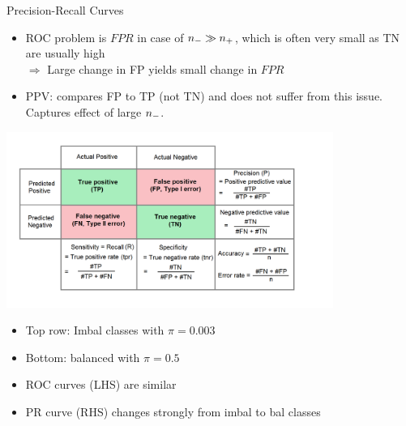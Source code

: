 \begin{vbframe}{Precision-Recall Curves}


\framebreak

\begin{itemize}
  \item ROC problem is $FPR$ in case of $n_{-} \gg n_{+}$, which is often
  very small as TN are usually high \\
  $\Rightarrow$ Large change in FP yields small change in $FPR$
  \item PPV: compares FP to TP (not TN) and does not suffer from this
  issue. Captures effect of large $n_{-}$.
\end{itemize}

\begin{center}
  \includegraphics[width=0.8\textwidth]{figure_man/roc-confusion_matrix.png}
\end{center}

\framebreak


\vspace{-0.2cm}
\begin{itemize}
  \item Top row: Imbal classes with $\pi = 0.003$
  \item Bottom: balanced with $\pi = 0.5$
  \item ROC curves (LHS) are similar
  \item PR curve (RHS) changes strongly from imbal to bal classes
\end{itemize}


\end{vbframe}
